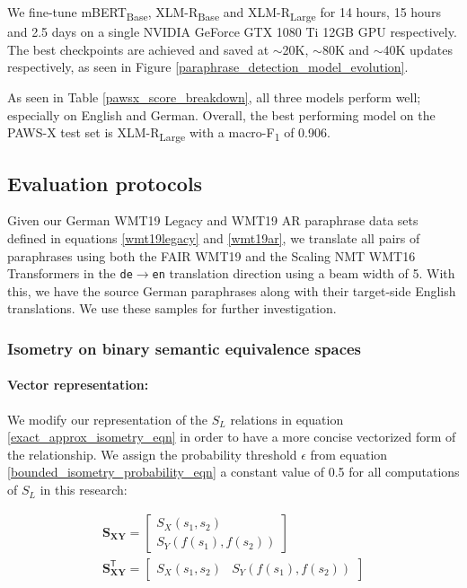 \documentclass[11pt,a4paper]{article}
\begin{document}
We fine-tune mBERT\textsubscript{Base}, XLM-R\textsubscript{Base} and XLM-R\textsubscript{Large} for 14 hours, 15 hours and 2.5 days on a single NVIDIA GeForce GTX 1080 Ti 12GB GPU respectively. The best checkpoints are achieved and saved at $\sim$20K, $\sim$80K and $\sim$40K updates respectively, as seen in Figure \ref{paraphrase_detection_model_evolution}.

As seen in Table \ref{pawsx_score_breakdown}, all three models perform well; especially on English and German. Overall, the best performing model on the PAWS-X test set is XLM-R\textsubscript{Large} with a macro-F\textsubscript{1} of 0.906.

\subsection{Evaluation protocols}

Given our German WMT19 Legacy and WMT19 AR paraphrase data sets defined in equations \ref{wmt19legacy} and \ref{wmt19ar}, we translate all pairs of paraphrases using both the FAIR WMT19 and the Scaling NMT WMT16 Transformers in the \texttt{de$\rightarrow$en} translation direction using a beam width of 5. With this, we have the source German paraphrases along with their target-side English translations. We use these samples for further investigation. 

\subsubsection{Isometry on binary semantic equivalence spaces}

\paragraph{Vector representation:} We modify our representation of the $S_L$ relations in equation \ref{exact_approx_isometry_eqn} in order to have a more concise vectorized form of the relationship. We assign the probability threshold $\epsilon$ from equation \ref{bounded_isometry_probability_eqn} a constant value of 0.5 for all computations of $S_L$ in this research:

\vspace{-5pt}
\begin{gather}
  \mathbf{S_{XY}} = \begin{bmatrix} S_X(s_1, s_2) \\[5pt] S_Y(f(s_1), f(s_2)) \end{bmatrix} \\[10pt] 
  \mathbf{S_{XY}^{\mathsf{T}}} = \begin{bmatrix} S_X(s_1, s_2) & S_Y(f(s_1), f(s_2)) \end{bmatrix}
\end{gather}
\end{document}
